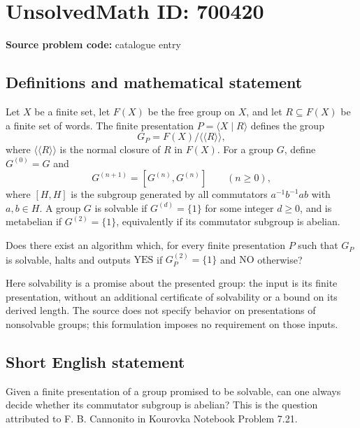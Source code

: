 \documentclass[11pt]{article}
\begin{document}
\section*{UnsolvedMath ID: 700420}
\textbf{Source problem code:} catalogue entry
\subsection{Definitions and mathematical statement}
Let \(X\) be a finite set, let \(F(X)\) be the free group on \(X\), and let \(R\subseteq F(X)\) be a finite set of words. The finite presentation \(P=\langle X\mid R\rangle\) defines the group
\[
G_P=F(X)/\langle\!\langle R\rangle\!\rangle,
\]
where \(\langle\!\langle R\rangle\!\rangle\) is the normal closure of \(R\) in \(F(X)\). For a group \(G\), define \(G^{(0)}=G\) and
\[
G^{(n+1)}=[G^{(n)},G^{(n)}]\qquad(n\geq 0),
\]
where \([H,H]\) is the subgroup generated by all commutators \(a^{-1}b^{-1}ab\) with \(a,b\in H\). A group \(G\) is solvable if \(G^{(d)}=\{1\}\) for some integer \(d\geq 0\), and is metabelian if \(G^{(2)}=\{1\}\), equivalently if its commutator subgroup is abelian.

Does there exist an algorithm which, for every finite presentation \(P\) such that \(G_P\) is solvable, halts and outputs \(\mathrm{YES}\) if \(G_P^{(2)}=\{1\}\) and \(\mathrm{NO}\) otherwise?

Here solvability is a promise about the presented group: the input is its finite presentation, without an additional certificate of solvability or a bound on its derived length. The source does not specify behavior on presentations of nonsolvable groups; this formulation imposes no requirement on those inputs.
\subsection{Short English statement}
Given a finite presentation of a group promised to be solvable, can one always decide whether its commutator subgroup is abelian? This is the question attributed to F. B. Cannonito in Kourovka Notebook Problem 7.21.
\end{document}

